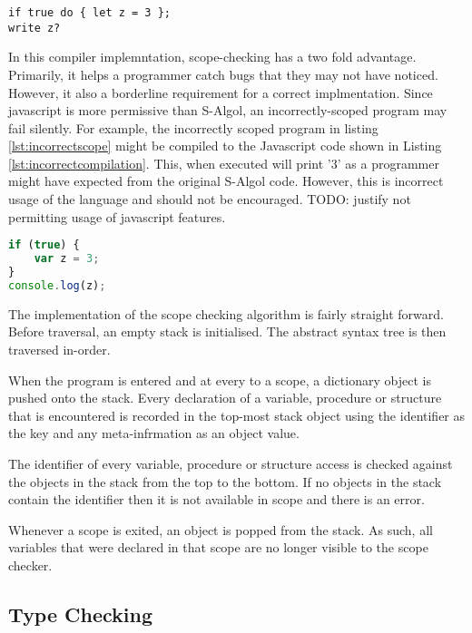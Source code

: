 \documentclass{article}
\begin{document}
\begin{lstlisting}[caption={Incorrectly scoped program},label={lst:incorrectscope}, escapechar="|"]
if true do { let z = 3 };
write z?
\end{lstlisting}

In this compiler implemntation, scope-checking has a two fold advantage. Primarily, it helps a programmer catch bugs that they may not have noticed. However, it also a borderline requirement for a correct implmentation. Since javascript is more permissive than S-Algol, an incorrectly-scoped program may fail silently. For example, the incorrectly scoped program in listing \ref{lst:incorrectscope} might be compiled to the Javascript code shown in Listing \ref{lst:incorrectcompilation}. This, when executed will print '3' as a programmer might have expected from the original S-Algol code. However, this is incorrect usage of the language and should not be encouraged. TODO: justify not permitting usage of javascript features.

\begin{lstlisting}[caption={Possible compilation of Listing \ref{lst:incorrectscope}},label={lst:incorrectcompilation}, language=javascript]
if (true) {
	var z = 3;
}
console.log(z);
\end{lstlisting}

The implementation of the scope checking algorithm is fairly straight forward. Before traversal, an empty stack is initialised. The abstract syntax tree is then traversed in-order.

When the program is entered and at every to a scope, a dictionary object is pushed onto the stack. Every declaration of a variable, procedure or structure that is encountered is recorded in the top-most stack object using the identifier as the key and any meta-infrmation as an object value.

The identifier of every variable, procedure or structure access is checked against the objects in the stack from the top to the bottom. If no objects in the stack contain the identifier then it is not available in scope and there is an error.

Whenever a scope is exited, an object is popped from the stack. As such, all variables that were declared in that scope are no longer visible to the scope checker.

\subsection{Type Checking}
\end{document}

